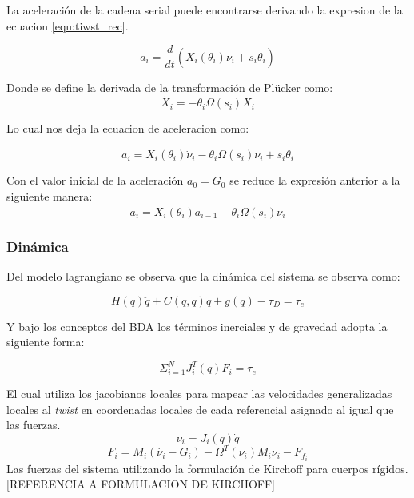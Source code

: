 La aceleración de la cadena serial puede encontrarse derivando la expresion de la ecuacion \ref{equ:tiwst_rec}.

\begin{equation}
a_i = \frac{d}{dt} (X_i(\theta_i)\nu_i + s_i\dot{\theta_i})
\end{equation}

Donde se define la derivada de la transformación de Plücker como:
\begin{equation}
\dot{X_i} = -\theta_i \Omega(s_i)X_i
\end{equation}

Lo cual nos deja la ecuacion de aceleracion como:

\begin{equation}
a_i = X_i(\theta_i)\dot{\nu}_i - \theta_i \Omega(s_i)\nu_i+ s_i\ddot{\theta_i}
\end{equation}

Con el valor inicial de la aceleración $a_0 = G_0$ se reduce la expresión anterior a la siguiente manera:
\begin{equation}
a_i = X_i(\theta_i)a_{i-1} - \dot{\theta_i}\Omega(s_i)\nu_i
\end{equation}

\subsubsection{Dinámica}

Del modelo lagrangiano se observa que la dinámica del sistema se observa como:

\begin{equation}\label{equ:lagrangiano_modelo}
H(q)\ddot{q} + C(q,\dot{q})\dot{q} +g(q) - \tau_D = \tau_e
\end{equation}

Y bajo los conceptos del BDA los términos inerciales y de gravedad adopta la siguiente forma:

\begin{equation}
\Sigma_{i=1}^N J_i^T(q)F_i = \tau_e
\end{equation}

El cual utiliza los jacobianos locales para mapear las velocidades generalizadas locales al \emph{twist} en coordenadas locales de cada referencial asignado al igual que las fuerzas.
\begin{equation} \label{equ:twist_loc}
\nu_i = J_i(q)\dot{q}
\end{equation}
\begin{equation}
F_i = M_i(\dot{\nu_i} - G_i) - \Omega^T(\nu_i)M_i\nu_i - F_{f_{i}}
\end{equation}
Las fuerzas del sistema utilizando la formulación de Kirchoff para cuerpos rígidos.[REFERENCIA A FORMULACION DE KIRCHOFF]


